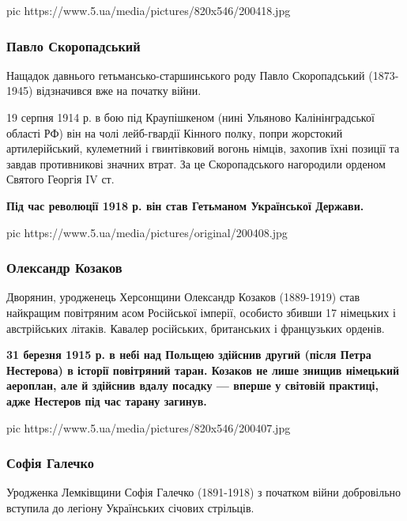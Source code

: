 \ifcmt
pic https://www.5.ua/media/pictures/820x546/200418.jpg
\fi

\subsubsection{Павло Скоропадський}

Нащадок давнього гетьмансько-старшинського роду Павло Скоропадський
(1873-1945) відзначився вже на початку війни.

19 серпня 1914 р. в бою під Краупішкеном (нині Ульяново Калінінградської
області РФ) він на чолі лейб-гвардії Кінного полку, попри жорстокий
артилерійський, кулеметний і гвинтівковий вогонь німців, захопив їхні
позиції та завдав противникові значних втрат. За це Скоропадського
нагородили орденом Святого Георгія IV ст.

\begin{leftbar}
	\bfseries
Під час революції 1918 р. він став Гетьманом Української Держави.
\end{leftbar}

\ifcmt
pic https://www.5.ua/media/pictures/original/200408.jpg
\fi

\subsubsection{Олександр Козаков}

Дворянин, уродженець Херсонщини Олександр Козаков (1889-1919) став
найкращим повітряним асом Російської імперії, особисто збивши 17 німецьких
і австрійських літаків. Кавалер російських, британських і французьких
орденів.

\begin{leftbar}
	\bfseries
31 березня 1915 р. в небі над Польщею здійснив другий (після Петра
Нестерова) в історії повітряний таран. Козаков не лише знищив німецький
аероплан, але й здійснив вдалу посадку --- вперше у світовій практиці,
адже Нестеров під час тарану загинув.
\end{leftbar}

\ifcmt
pic https://www.5.ua/media/pictures/820x546/200407.jpg
\fi

\subsubsection{Софія Галечко}

Уродженка Лемківщини Софія Галечко (1891-1918) з початком війни
добровільно вступила до легіону Українських січових стрільців.


